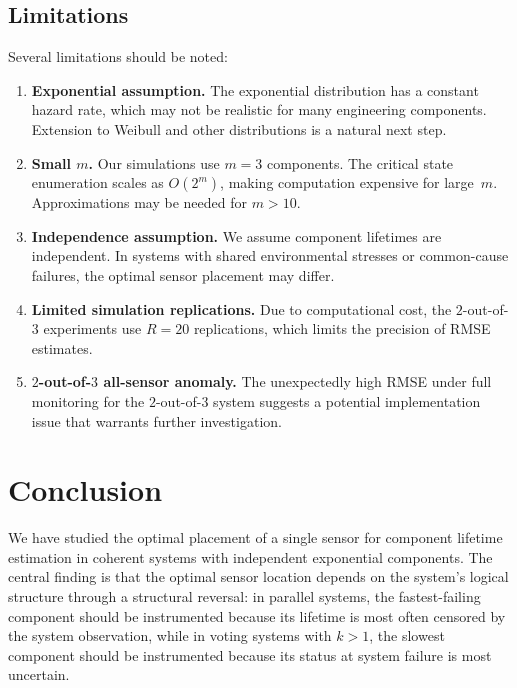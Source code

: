\documentclass[12pt]{article}
\theoremstyle{definition}
\theoremstyle{remark}
\begin{document}
\subsection{Limitations}
\label{sec:limitations}

Several limitations should be noted:
\begin{enumerate}
  \item \textbf{Exponential assumption.}  The exponential distribution
    has a constant hazard rate, which may not be realistic for many
    engineering components.  Extension to Weibull and other
    distributions is a natural next step.

  \item \textbf{Small $m$.}  Our simulations use $m = 3$ components.
    The critical state enumeration scales as $O(2^m)$, making
    computation expensive for large~$m$.  Approximations may be needed
    for $m > 10$.

  \item \textbf{Independence assumption.}  We assume component
    lifetimes are independent.  In systems with shared environmental
    stresses or common-cause failures, the optimal sensor placement
    may differ.

  \item \textbf{Limited simulation replications.}  Due to
    computational cost, the $2$-out-of-$3$ experiments use $R = 20$
    replications, which limits the precision of RMSE estimates.

  \item \textbf{$2$-out-of-$3$ all-sensor anomaly.}  The unexpectedly
    high RMSE under full monitoring for the $2$-out-of-$3$ system
    suggests a potential implementation issue that warrants further
    investigation.
\end{enumerate}


\section{Conclusion}
\label{sec:conclusion}

We have studied the optimal placement of a single sensor for
component lifetime estimation in coherent systems with independent
exponential components.  The central finding is that the optimal
sensor location depends on the system's logical structure through a
structural reversal: in parallel systems, the fastest-failing
component should be instrumented because its lifetime is most often
censored by the system observation, while in voting systems with
$k > 1$, the slowest component should be instrumented because its
status at system failure is most uncertain.
\end{document}
